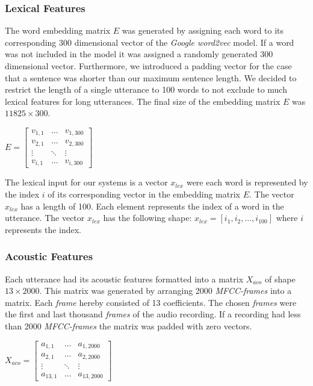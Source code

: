 \documentclass[11pt,a4paper]{article}
\begin{document}
	\subsubsection*{Lexical Features}
	\label{sec:lexicalFeatures}
	The word embedding matrix $E$ was generated by assigning each word to its corresponding 300 dimensional vector of the \textit{Google word2vec} model. If a word was not included in the model it was assigned a randomly generated 300 dimensional vector. Furthermore, we introduced a padding vector for the case that a sentence was shorter than our maximum sentence length. We decided to restrict the length of a single utterance to 100 words to not exclude to much lexical features for long utterances. The final size of the embedding matrix $E$ was $11825  \times 300$.
	\begin{center}
		$ E= 
		\begin{bmatrix}
		v_{1,1}	&  \dots	 & v_{1,300}    \\
		v_{2,1}	 	& \dots  & v_{2,300} 	\\
		\vdots	 	& \ddots & \vdots		\\
		v_{i,1} 	& \dots	 & v_{i,300}
		\end{bmatrix}
		$
	\end{center}
	\vspace{0.3cm}
	The lexical input for our systems is a vector $x_{lex}$ were each word is represented by the index $i$ of its corresponding vector in the embedding matrix $E$. The vector $x_{lex}$ has a length of 100. Each element represents the index of a word in the utterance. The vector $x_{lex}$ has the following shape: $x_{lex} = [i_{1}, i_{2}, ..., i_{100}]$ where $i$ represents the index.
	
	\subsubsection*{Acoustic Features}
	Each utterance had its acoustic features formatted into a matrix $X_{aco}$ of shape $13 \times 2000$. This matrix was generated by arranging 2000 \textit{MFCC-frames} into a matrix. Each \textit{frame} hereby consisted of 13 coefficients. The chosen \textit{frames} were the first and last thousand \textit{frames} of the audio recording. If a recording had less than 2000 \textit{MFCC-frames} the matrix was padded with zero vectors.
	
	\vspace{0.3cm}
	\begin{center}
		$ X_{aco}= 
		\begin{bmatrix}
		a_{1,1}	&  \dots	 & a_{1,2000}   \\
		a_{2,1}	 	& \dots  & a_{2,2000} 	\\
		\vdots	 	& \ddots & \vdots		\\
		a_{13,1} 	& \dots	 & a_{13,2000}
		\end{bmatrix}
		$
	\end{center}
	\vspace{0.3cm}
	
\end{document}
